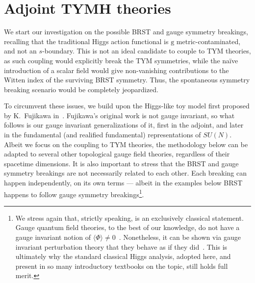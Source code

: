 \documentclass[../main.tex]{subfiles}
\begin{document}
\section{Adjoint TYMH theories}%
\label{sec:adjoint}

We start our investigation on the possible BRST and gauge symmetry breakings, recalling that the traditional Higgs action functional is $\mathrm{g}$ metric-contaminated, and not an $s$-boundary. This is not an ideal candidate to couple to TYM theories, as such coupling would explicitly break the TYM symmetries, while the naïve introduction of a scalar field would give non-vanishing contributions to the Witten index of the surviving BRST symmetry. Thus, the spontaneous symmetry breaking scenario would be completely jeopardized.

To circumvent these issues, we build upon the Higgs-like toy model first proposed by K.~Fujikawa in~\cite{fujikawa1983a}. Fujikawa's original work is not gauge invariant, so what follows is our gauge invariant generalizations of it, first in the adjoint, and later in the fundamental (and realified fundamental) representations of $SU(N)$. Albeit we focus on the coupling to TYM theories, the methodology below can be adapted to several other topological gauge field theories, regardless of their spacetime dimensions. It is also important to stress that the BRST and gauge symmetry breakings are not necessarily related to each other. Each breaking can happen independently, on its own terms --- albeit in the examples below BRST happens to follow gauge symmetry breakings\footnote{ We stress again that, strictly speaking,  is an exclusively classical statement. Gauge quantum field theories, to the best of our knowledge, do not have a gauge invariant notion of $\langle \Phi \rangle \neq 0 $~\cite{elitzur1975a,frohlich1980a,frohlich1981a}. Nonetheless, it can be shown via gauge invariant perturbation theory that they behave as if they did~\cite{frohlich1980a,frohlich1981a,maas2019a}. This is ultimately why the standard classical Higgs  analysis, adopted here, and present in so many introductory textbooks on the topic, still holds full merit.}.
\end{document}
